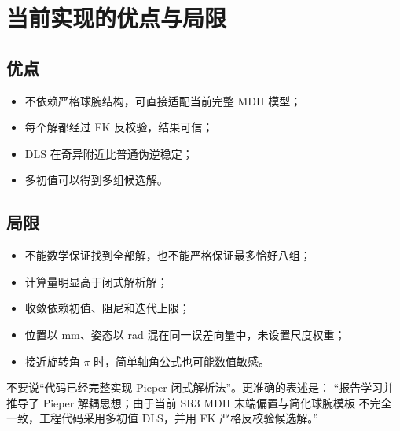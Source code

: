 \section{当前实现的优点与局限}

\subsection{优点}

\begin{itemize}
  \item 不依赖严格球腕结构，可直接适配当前完整 MDH 模型；
  \item 每个解都经过 FK 反校验，结果可信；
  \item DLS 在奇异附近比普通伪逆稳定；
  \item 多初值可以得到多组候选解。
\end{itemize}

\subsection{局限}

\begin{itemize}
  \item 不能数学保证找到全部解，也不能严格保证最多恰好八组；
  \item 计算量明显高于闭式解析解；
  \item 收敛依赖初值、阻尼和迭代上限；
  \item 位置以 mm、姿态以 rad 混在同一误差向量中，未设置尺度权重；
  \item 接近旋转角 $\pi$ 时，简单轴角公式也可能数值敏感。
\end{itemize}

\begin{warningbox}[报告答辩建议]
不要说“代码已经完整实现 Pieper 闭式解析法”。更准确的表述是：
“报告学习并推导了 Pieper 解耦思想；由于当前 SR3 MDH 末端偏置与简化球腕模板
不完全一致，工程代码采用多初值 DLS，并用 FK 严格反校验候选解。”
\end{warningbox}

